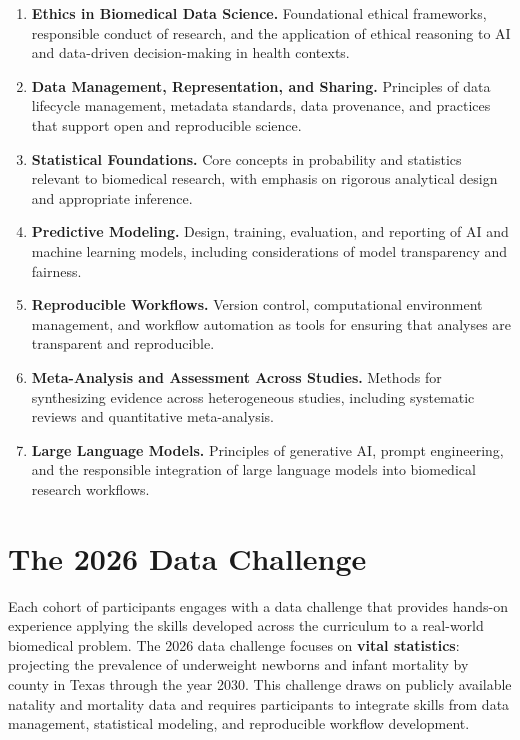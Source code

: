\begin{enumerate}
    \item \textbf{Ethics in Biomedical Data Science.} Foundational ethical frameworks, responsible conduct of research, and the application of ethical reasoning to AI and data-driven decision-making in health contexts.
    \item \textbf{Data Management, Representation, and Sharing.} Principles of data lifecycle management, metadata standards, data provenance, and practices that support open and reproducible science.
    \item \textbf{Statistical Foundations.} Core concepts in probability and statistics relevant to biomedical research, with emphasis on rigorous analytical design and appropriate inference.
    \item \textbf{Predictive Modeling.} Design, training, evaluation, and reporting of AI and machine learning models, including considerations of model transparency and fairness.
    \item \textbf{Reproducible Workflows.} Version control, computational environment management, and workflow automation as tools for ensuring that analyses are transparent and reproducible.
    \item \textbf{Meta-Analysis and Assessment Across Studies.} Methods for synthesizing evidence across heterogeneous studies, including systematic reviews and quantitative meta-analysis.
    \item \textbf{Large Language Models.} Principles of generative AI, prompt engineering, and the responsible integration of large language models into biomedical research workflows.
\end{enumerate}

\section*{The 2026 Data Challenge}
\label{sec:intro-challenge}

Each cohort of \DAIR{} participants engages with a data challenge that provides hands-on experience applying the skills developed across the curriculum to a real-world biomedical problem. The 2026 data challenge focuses on \textbf{vital statistics}: projecting the prevalence of underweight newborns and infant mortality by county in Texas through the year 2030. This challenge draws on publicly available natality and mortality data and requires participants to integrate skills from data management, statistical modeling, and reproducible workflow development.

